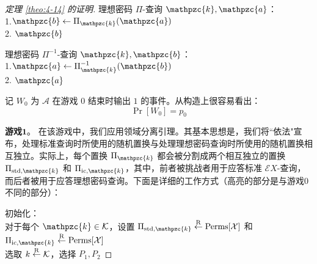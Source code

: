 \begin{proof}[定理 \ref{theo:4-14} 的证明]
\vspace{5pt}

\hspace*{5pt} 理想密码 $\Pi$-查询 $\mathpzc{k},\mathpzc{a}$：\\
\hspace*{26pt} 1.\quad\;\;$\mathpzc{b}\leftarrow\Pi_\mathpzc{k}(\mathpzc{a})$\\
\hspace*{26pt} 2.\quad\; $\mathpzc{b}$

\vspace{5pt}

\hspace*{5pt} 理想密码 $\Pi^{-1}$-查询 $\mathpzc{k},\mathpzc{b}$：\\
\hspace*{26pt} 1.\quad\;\;$\mathpzc{a}\leftarrow\Pi_\mathpzc{k}^{-1}(\mathpzc{b})$\\
\hspace*{26pt} 2.\quad\; $\mathpzc{a}$

\vspace{5pt}

记 $W_0$ 为 $\mathcal{A}$ 在游戏 $0$ 结束时输出 $1$ 的事件。从构造上很容易看出：
\begin{equation}\label{eq:4-40}
\Pr[W_0]=p_0
\end{equation}

\noindent\textbf{游戏$\mathbf{1}$}。
在该游戏中，我们应用领域分离引理。其基本思想是，我们将``依法"宣布，处理标准查询时所使用的随机置换与处理理想密码查询时所使用的随机置换相互独立。实际上，每个置换 $\Pi_\mathpzc{k}$ 都会被分割成两个相互独立的置换 $\Pi_{{\rm std},\mathpzc{k}}$ 和 $\Pi_{{\rm ic},\mathpzc{k}}$，其中，前者被挑战者用于应答标准 $\mathcal{E}X$-查询，而后者被用于应答理想密码查询。下面是详细的工作方式（高亮的部分是与游戏$0$不同的部分）：

\vspace{5pt}

\hspace*{5pt} 初始化：\\
\hspace*{50pt} 对于每个 $\mathpzc{k}\in\mathcal{K}$，设置 \colorbox{gray!50}{$\Pi_{{\rm std},\mathpzc{k}}\overset{\rm R}\leftarrow{\rm Perms}[\mathcal{X}]$ 和 $\Pi_{{\rm ic},\mathpzc{k}}\overset{\rm R}\leftarrow{\rm Perms}[\mathcal{X}]$}\\
\hspace*{50pt} 选取 $k\overset{\rm R}\leftarrow\mathcal{K}$，选择 $P_1,P_2$

\vspace{5pt}


\end{proof}
